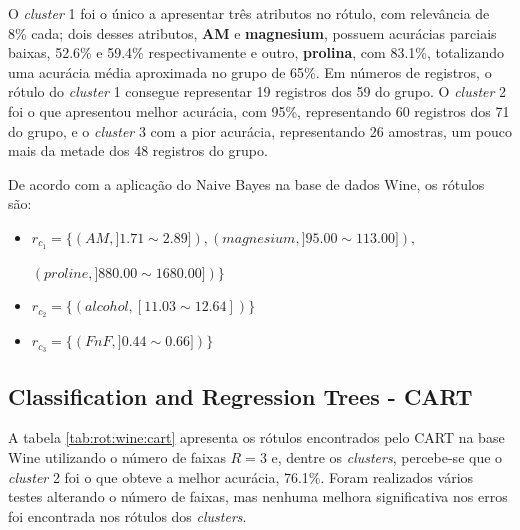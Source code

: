 O \textit{cluster} 1 foi o único a apresentar três atributos no rótulo, com relevância de 8\% cada; dois desses atributos, \textbf{AM} e \textbf{magnesium}, possuem acurácias parciais baixas, 52.6\% e 59.4\% respectivamente e outro, \textbf{prolina}, com 83.1\%, totalizando uma acurácia média aproximada no grupo de 65\%. Em números de registros, o rótulo do \textit{cluster} 1 consegue representar 19 registros dos 59 do grupo. O \textit{cluster} 2 foi o que apresentou melhor acurácia, com 95\%, representando 60 registros dos 71 do grupo, e o \textit{cluster} 3 com a pior acurácia, representando 26 amostras, um pouco mais da metade dos 48 registros do grupo. 




De acordo com a aplicação do Naive Bayes na base de dados Wine, os rótulos são: 

\begin{itemize}[noitemsep]
    \item ${r_{c_1}=\{ (AM, ] 1.71  \sim  2.89]),(magnesium, ] 95.00 \sim  113.00]),}$
    
    ${(proline, ] 880.00 \sim 1680.00]) \} }$
    \item ${r_{c_2}=\{(alcohol,[   11.03 \sim  12.64  ] ) \} }$
    \item ${r_{c_3}=\{ (FnF, ] 0.44 \sim 0.66 ])\} }$
 \end{itemize}


\subsection{Classification and Regression Trees - CART} \label{cap:resultados:ssec:wine:cart}

A tabela \ref{tab:rot:wine:cart} apresenta os rótulos encontrados pelo CART na base Wine utilizando o número de faixas ${R=3}$ e, dentre os \textit{clusters}, percebe-se que o \textit{cluster} 2 foi o que obteve a melhor acurácia, 76.1\%. Foram realizados vários testes alterando o número de faixas, mas nenhuma melhora significativa nos erros foi encontrada nos rótulos dos \textit{clusters}. 


